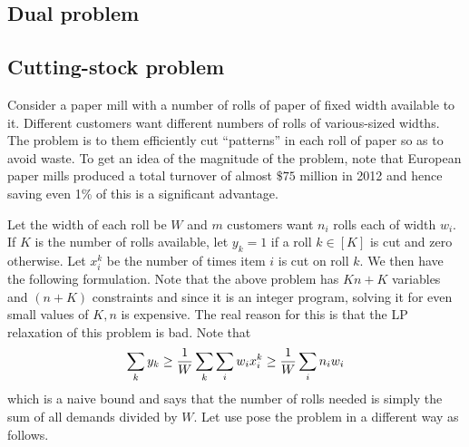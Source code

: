 \documentclass[letterpaper, 10pt, twocolumn, reqno]{amsart}
\begin{document}
\subsection{Dual problem}
\label{ssec:dual}


\subsection{Cutting-stock problem}
\label{ssec:cutting_stock}

Consider a paper mill with a number of rolls of paper of fixed width available to it. Different customers want different numbers of rolls of various-sized widths. The problem is to them efficiently cut ``patterns'' in each roll of paper so as to avoid waste. To get an idea of the magnitude of the problem, note that European paper mills produced a total turnover of almost $\$ 75$ million in 2012 and hence saving even 1\% of this is a significant advantage.

Let the width of each roll be $W$ and $m$ customers want $n_i$ rolls each of width $w_i$. If $K$ is the number of rolls available, let $y_k = 1$ if a roll $k \in [K]$ is cut and zero otherwise. Let $x_i^k$ be the number of times item $i$ is cut on roll $k$. We then have the following formulation.
Note that the above problem has $Kn + K$ variables and $(n+K)$ constraints and since it is an integer program, solving it for even small values of $K, n$ is expensive. The real reason for this is that the LP relaxation of this problem is bad. Note that
$$
\sum_k y_k \geq \frac{1}{W} \sum_k \sum_i w_i x_i^k \geq \frac{1}{W} \sum_i n_i w_i
$$
which is a naive bound and says that the number of rolls needed is simply the sum of all demands divided by $W$. Let use pose the problem in a different way as follows.
\end{document}
